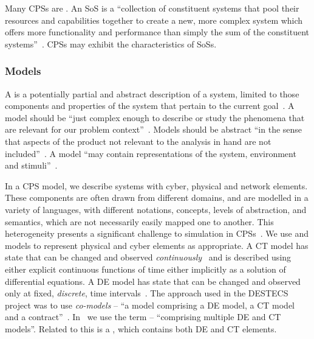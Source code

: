 Many CPSs are . An SoS is a ``collection of constituent systems that pool their resources and capabilities together to create a new, more complex system which offers more functionality and performance than simply the sum of the constituent systems''~\cite{Holt&14}. CPSs may exhibit the characteristics of SoSs.

\subsubsection{Models}
\label{sec:concepts:models}

A  is a  potentially partial and abstract description of a system, limited to those components and properties of the system that pertain to the current goal~\cite{Holt&14}. A model should be ``just complex enough to describe or study the phenomena that are relevant for our problem context''~\cite{Amerongen10}. Models should be abstract ``in the sense that aspects of the product not relevant to the analysis in hand are not included''~\cite{Fitzgerald&98b}. A model ``may contain representations of the system, environment and stimuli''~\cite{Fitzgerald&14c}.

In a CPS model, we describe systems with cyber, physical and network elements. These components are  often drawn from different domains, and are modelled in a variety of languages, with different notations, concepts, levels of abstraction, and semantics, which are not necessarily easily mapped one to another. This heterogeneity presents a significant challenge to simulation in CPSs~\cite{Holt&14}. We use  and  models to represent physical and cyber elements as appropriate. A CT model has state that can be changed and observed \emph{continuously}~\cite{Amerongen10} and is described using either explicit continuous functions of time  either implicitly as a solution of differential equations. A DE model has state that can be changed and observed only at fixed, \emph{discrete}, time intervals~\cite{Amerongen10}.  The approach used in the DESTECS project was to use \emph{co-models} -- ``a model comprising a DE model, a CT model and a contract''~\cite{Broenink&12b}. In \into\ we use the term  -- ``comprising multiple  DE and CT models''. Related to this is a , which contains both DE and CT elements.

